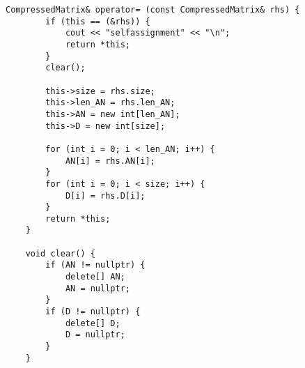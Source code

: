 \begin{lstlisting}[label = list0, caption = пример опертара присваивания для структуры CompressedMatrix]
	CompressedMatrix& operator= (const CompressedMatrix& rhs) {
		if (this == (&rhs)) {
			cout << "selfassignment" << "\n";
			return *this;
		}
		clear();
		
		this->size = rhs.size;
		this->len_AN = rhs.len_AN;
		this->AN = new int[len_AN];
		this->D = new int[size];
		
		for (int i = 0; i < len_AN; i++) {
			AN[i] = rhs.AN[i];
		}
		for (int i = 0; i < size; i++) {
			D[i] = rhs.D[i];
		}
		return *this;
	}
	
	void clear() {
		if (AN != nullptr) {
			delete[] AN;
			AN = nullptr;
		}
		if (D != nullptr) {
			delete[] D;
			D = nullptr;
		}
	}
\end{lstlisting}


